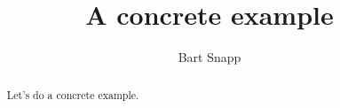 \documentclass[handout,nooutcomes,noauthor]{ximera}
\title{A concrete example}
\author{Bart Snapp}
\begin{document}
\begin{abstract}
  Let's do a concrete example.
\end{abstract}
\maketitle


\begin{listOutcomes}
\item 
\end{listOutcomes}

\mynewpage



\begin{question}
\end{question}

\mynewpage


\begin{question}
\end{question}

\mynewpage


\begin{question}
\end{question}








\end{document}
